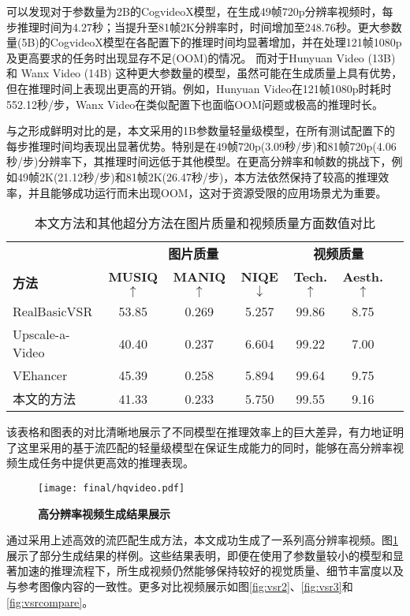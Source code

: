 可以发现对于参数量为2B的CogvideoX模型，在生成49帧720p分辨率视频时，每步推理时间为4.27秒；当提升至81帧2K分辨率时，时间增加至248.76秒。更大参数量(5B)的CogvideoX模型在各配置下的推理时间均显著增加，并在处理121帧1080p及更高要求的任务时出现显存不足(OOM)的情况。
而对于Hunyuan Video (13B) 和 Wanx Video (14B) 这种更大参数量的模型，虽然可能在生成质量上具有优势，但在推理时间上表现出更高的开销。例如，Hunyuan Video在121帧1080p时耗时552.12秒/步，Wanx Video在类似配置下也面临OOM问题或极高的推理时长。

与之形成鲜明对比的是，本文采用的1B参数量轻量级模型，在所有测试配置下的每步推理时间均表现出显著优势。特别是在49帧720p(3.09秒/步)和81帧720p(4.06秒/步)分辨率下，其推理时间远低于其他模型。在更高分辨率和帧数的挑战下，例如49帧2K(21.12秒/步)和81帧2K(26.47秒/步)，本方法依然保持了较高的推理效率，并且能够成功运行而未出现OOM，这对于资源受限的应用场景尤为重要。
\begin{table}[!t]
\centering
\caption{本文方法和其他超分方法在图片质量和视频质量方面数值对比}
\small
\begin{tabular}{lcccccc}
\toprule
& \multicolumn{3}{c}{\textbf{图片质量}} & \multicolumn{2}{c}{\textbf{视频质量 \cite{dover}}} \\
\cmidrule(lr){2-4} \cmidrule(lr){5-6} 
\textbf{方法} & \textbf{MUSIQ\cite{ke2021musiq}$\uparrow$} & 
\textbf{MANIQ\cite{maniqa}$\uparrow$} &
\textbf{NIQE\cite{niqe}$\downarrow$} &  
\textbf{Tech.$\uparrow$} & \textbf{Aesth.$\uparrow$} \\
\midrule
RealBasicVSR\cite{RealBasicVSR} &53.85 &0.269&5.257 &99.86& 8.75 \\
Upscale-a-Video\cite{zhou2024upscaleavideo}&40.40 &0.237 &6.604 & 99.22& 7.00\\
VEhancer\cite{he2024venhancer}&45.39 &0.258 &5.894&99.64&9.75\\
\bottomrule
本文的方法&41.33 &0.233 & 5.750&99.55&9.16 \\
\end{tabular}
\label{tab:vsr_compare}
\end{table}
该表格和图表的对比清晰地展示了不同模型在推理效率上的巨大差异，有力地证明了这里采用的基于流匹配的轻量级模型在保证生成能力的同时，能够在高分辨率视频生成任务中提供更高效的推理表现。
\begin{figure}[h]
    \centering
    \texttt{[image: final/hqvideo.pdf]}
    \caption{\textbf{高分辨率视频生成结果展示}}
    \label{hqvideo}
\end{figure}
通过采用上述高效的流匹配生成方法，本文成功生成了一系列高分辨率视频。图\ref{hqvideo}展示了部分生成结果的样例。这些结果表明，即便在使用了参数量较小的模型和显著加速的推理流程下，所生成视频仍然能够保持较好的视觉质量、细节丰富度以及与参考图像内容的一致性。更多对比视频展示如图\ref{fig:vsr2}、\ref{fig:vsr3}和\ref{fig:vsrcompare}。

